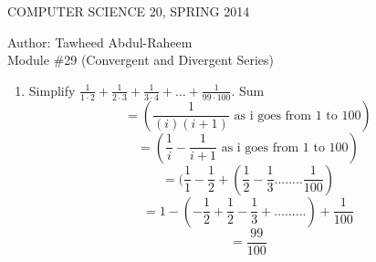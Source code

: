 \documentclass[12pt]{article}
\begin{document}
\begin{center}
  COMPUTER SCIENCE 20, SPRING 2014 \\
  \smallskip

Author: Tawheed Abdul-Raheem \\
  Module \#29 (Convergent and Divergent Series)
\end{center}

\begin{enumerate}

  \item Simplify $\frac{1}{1 \cdot 2} + \frac{1}{2 \cdot 3} + \frac{1}{3 \cdot 4} + \ldots + \frac{1}{99 \cdot 100}$.
    Sum \[ = (\frac{1}{(i)(i+1)} \text{ as i goes from 1 to } 100) \]
    \[= (\frac{1}{i} - \frac{1}{i+1} \text{ as i goes from 1 to } 100) \]
    \[= (\frac{1}{1} - \frac{1}{2} + (\frac{1}{2} - \frac{1}{3} ........ \frac{1}{100}) \]
    \[= 1 - (-\frac{1}{2} + \frac{1}{2} - \frac{1}{3} + ......... ) + \frac{1}{100} \]
    \[ = \frac{99}{100} \]

\end{enumerate}
\end{document}
